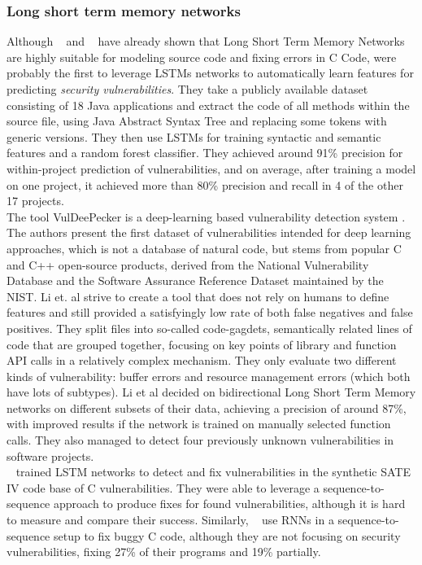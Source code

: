 \documentclass[
	a4paper,
	pagesize,
	pdftex,
	12pt,
	twoside, %
	BCOR=5mm, %
	ngerman,
	fleqn,
	final,
	]{scrartcl}
\begin{document}
\subsubsection{Long short term memory networks}
Although ~\cite{Gupta.2017b} and ~\cite{Dam.2016b} have already shown that Long Short Term Memory Networks are highly suitable for modeling source code and fixing errors in C Code, \cite{Dam.2017} were probably the first to leverage LSTMs networks to automatically learn features for predicting \textit{security vulnerabilities}. They take a publicly available dataset consisting of 18 Java applications and extract the code of all methods within the source file, using Java Abstract Syntax Tree and replacing some tokens with generic versions. They then use LSTMs for training syntactic and semantic features and a random forest classifier. They achieved around 91\% precision for within-project prediction of vulnerabilities, and on average, after training a model on one project, it achieved more than 80\% precision and recall in 4 of the other 17 projects.\\
The tool VulDeePecker is a deep-learning based vulnerability detection system \cite{Li.2018}. The authors present the first dataset of vulnerabilities intended for deep learning approaches, which is not a database of natural code, but stems from popular C and C++ open-source products, derived from the National Vulnerability Database and the Software Assurance Reference Dataset maintained by the NIST. Li et. al strive to create a tool that does not rely on humans to define features and still provided a satisfyingly low rate of both false negatives and false positives. They split files into so-called code-gagdets, semantically related lines of code that are grouped together, focusing on key points of library and function API calls in a relatively complex mechanism. They only evaluate two different kinds of vulnerability: buffer errors and resource management errors (which both have lots of subtypes). Li et al decided on bidirectional Long Short Term Memory networks on different subsets of their data, achieving a precision of around 87\%, with improved results if the network is trained on manually selected function calls. They also managed to detect four previously unknown vulnerabilities in software projects. \\
~\cite{Harer.2018} trained LSTM networks to detect and fix vulnerabilities in the synthetic SATE IV code base of C vulnerabilities. They were able to leverage a sequence-to-sequence approach to produce fixes for found vulnerabilities, although it is hard to measure and compare their success. Similarly, ~\cite{Gupta.2017} use RNNs in a sequence-to-sequence setup to fix buggy C code, although they are not focusing on security vulnerabilities, fixing 27\% of their programs and 19\% partially.
\end{document}
